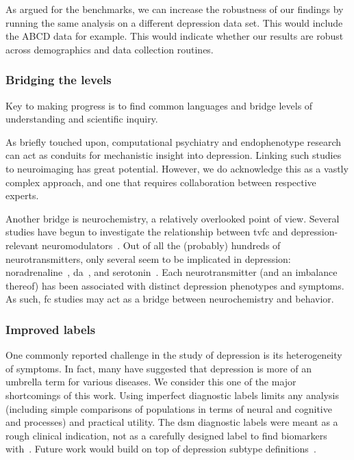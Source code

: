 As argued for the benchmarks, we can increase the robustness of our findings by running the same analysis on a different depression data set.
This would include the ABCD data for example.
This would indicate whether our results are robust across demographics and data collection routines.

\subsubsection{Bridging the levels}

Key to making progress is to find common languages and bridge levels of understanding and scientific inquiry.

As briefly touched upon, computational psychiatry and endophenotype research can act as conduits for mechanistic insight into depression.
Linking such studies to neuroimaging has great potential.
However, we do acknowledge this as a vastly complex approach, and one that requires collaboration between respective experts.

Another bridge is neurochemistry, a relatively overlooked point of view.
Several studies have begun to investigate the relationship between \gls{tvfc} and depression-relevant neuromodulators~\parencite{Shine2019}.
Out of all the (probably) hundreds of neurotransmitters, only several seem to be implicated in depression: noradrenaline~\parencite[also known as norepinephrine; a neurotransmitter found in pleasure pathways; see][]{Shine2018}, \gls{da}~\parencite{Shafiei2019}, and serotonin~\parencite{Klaassens2017}.
Each neurotransmitter (and an imbalance thereof) has been associated with distinct depression phenotypes and symptoms.
As such, \gls{fc} studies may act as a bridge between neurochemistry and behavior.

\subsubsection{Improved labels}

One commonly reported challenge in the study of depression is its heterogeneity of symptoms.
In fact, many have suggested that depression is more of an umbrella term for various diseases.
We consider this one of the major shortcomings of this work.
Using imperfect diagnostic labels limits any analysis (including simple comparisons of populations in terms of neural and cognitive and processes) and practical utility.
The \gls{dsm} diagnostic labels were meant as a rough clinical indication, not as a carefully designed label to find biomarkers with~\parencite{Fried2022b}.
Future work would build on top of depression subtype definitions~\parencite{Tokuda2018}.

